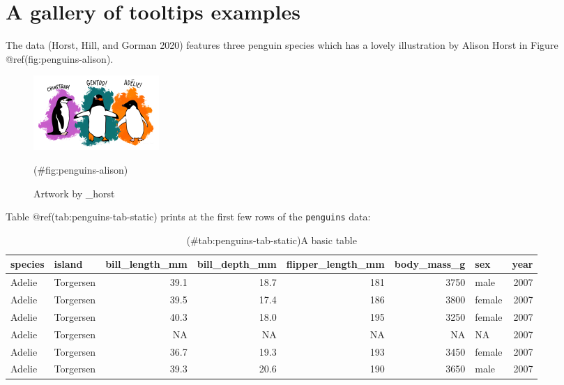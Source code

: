 \hypertarget{a-gallery-of-tooltips-examples}{%
\section{A gallery of tooltips examples}\label{a-gallery-of-tooltips-examples}}

The  data (Horst, Hill, and Gorman 2020) features three penguin species which has a lovely illustration by Alison Horst in Figure @ref(fig:penguins-alison).

\begin{figure}
\includegraphics[width=1\linewidth,height=0.3\textheight]{penguins} \caption{Artwork by \@allison\_horst}(\#fig:penguins-alison)
\end{figure}

Table @ref(tab:penguins-tab-static) prints at the first few rows of the \texttt{penguins} data:

\begin{table}

\caption{(\#tab:penguins-tab-static)A basic table}
\centering
\fontsize{7}{9}\selectfont
\begin{tabular}[t]{l|l|r|r|r|r|l|r}
\hline
species & island & bill\_length\_mm & bill\_depth\_mm & flipper\_length\_mm & body\_mass\_g & sex & year\\
\hline
Adelie & Torgersen & 39.1 & 18.7 & 181 & 3750 & male & 2007\\
\hline
Adelie & Torgersen & 39.5 & 17.4 & 186 & 3800 & female & 2007\\
\hline
Adelie & Torgersen & 40.3 & 18.0 & 195 & 3250 & female & 2007\\
\hline
Adelie & Torgersen & NA & NA & NA & NA & NA & 2007\\
\hline
Adelie & Torgersen & 36.7 & 19.3 & 193 & 3450 & female & 2007\\
\hline
Adelie & Torgersen & 39.3 & 20.6 & 190 & 3650 & male & 2007\\
\hline
\end{tabular}
\end{table}

